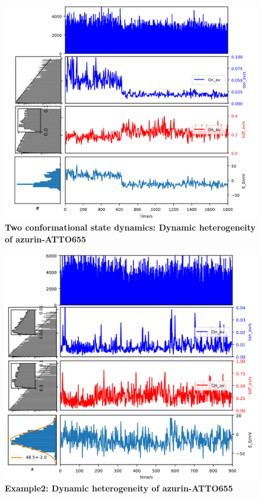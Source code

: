 \begin{figure}
  \centering
  \includegraphics[width=\textwidth]{dynamic_trace_steps}
  \caption{\textbf{Two conformational state dynamics: Dynamic heterogeneity of azurin-ATTO655}}
  \label{SIfig:dynamic_trace_steps}
\end{figure}

\begin{figure}
  \centering
  \includegraphics[width=\textwidth]{dynamic_Point_20_75mV_S105}
  \caption{\textbf{Example2: Dynamic heterogeneity of azurin-ATTO655}}
  \label{SIfig:dynamic_Point_20_75mV_S105}
\end{figure}

